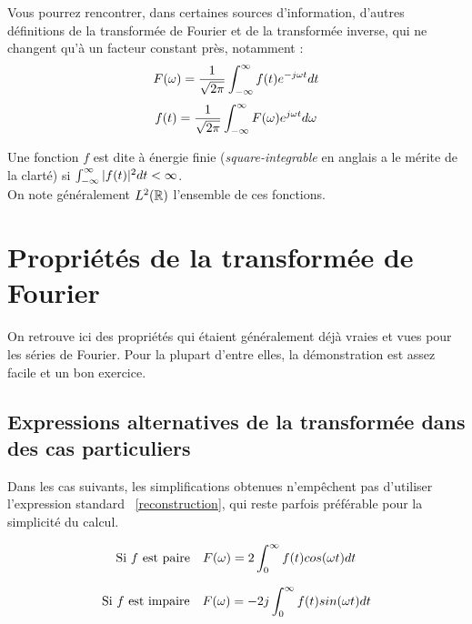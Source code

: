 \begin{remark}

Vous pourrez rencontrer, dans certaines sources d'information,
d'autres définitions de la transformée de Fourier et de la transformée
inverse, qui ne changent qu'à un facteur constant près, notamment :
\begin{equation}
F(\omega)=\frac{1}{\sqrt{2\pi}}\int_{-\infty}^{\infty} f(t)e^{-j\omega t}dt
\end{equation}
 \begin{equation}
f(t)=\frac{1}{\sqrt{2\pi}}\int_{-\infty}^{\infty} F(\omega)e^{j\omega t}d\omega
\end{equation}

\end{remark}

\begin{definition}
Une fonction $f$ est dite à énergie finie (\emph{square-integrable} en anglais a le mérite de la clarté) si $\int_{-\infty}^{\infty} |f(t)|^2dt<\infty$. \\ On note généralement $L^2(\mathbb{R})$ l'ensemble de ces fonctions.
\end{definition}


\section{Propriétés de la transformée de Fourier}

On retrouve ici des propriétés qui étaient généralement déjà vraies et vues pour les séries de Fourier.
Pour la plupart d'entre elles, la démonstration est assez facile et un bon exercice.

\subsection{Expressions alternatives de la transformée dans des cas particuliers}

Dans les cas suivants, les simplifications obtenues n'empêchent pas
d'utiliser l'expression { standard }~\ref{reconstruction}, qui
reste parfois préférable pour la simplicité du calcul.

\begin{equation}
\text{Si $f$ est paire} \quad F(\omega)=2\int_{0}^{\infty} f(t)cos(\omega t)dt
\end{equation}

 \begin{equation}
\text{Si $f$ est impaire} \quad F(\omega)=-2j\int_{0}^{\infty} f(t)sin(\omega t)dt    
  \end{equation}
